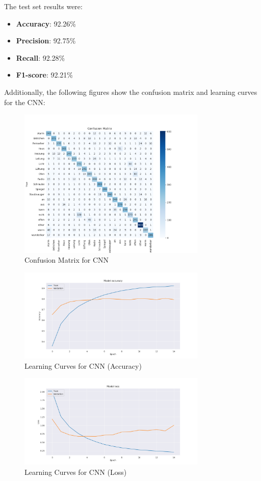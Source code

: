 The test set results were:
\begin{itemize}
    \item \textbf{Accuracy}: 92.26\%
    \item \textbf{Precision}: 92.75\%
    \item \textbf{Recall}: 92.28\%
    \item \textbf{F1-score}: 92.21\%
\end{itemize}

Additionally, the following figures show the confusion matrix and learning curves for the CNN:
\begin{figure}[h!]
    \centering
    \includegraphics[width=0.8\textwidth]{fig/confusion_matrix.png}
    \caption{Confusion Matrix for CNN}
\end{figure}

\begin{figure}[h!]
    \centering
    \includegraphics[width=0.8\textwidth]{fig/learning_curves_accuracy.png}
    \caption{Learning Curves for CNN (Accuracy)}
\end{figure}

\begin{figure}[h!]
    \centering
    \includegraphics[width=0.8\textwidth]{fig/learning_curves_loss.png}
    \caption{Learning Curves for CNN (Loss)}
\end{figure}
